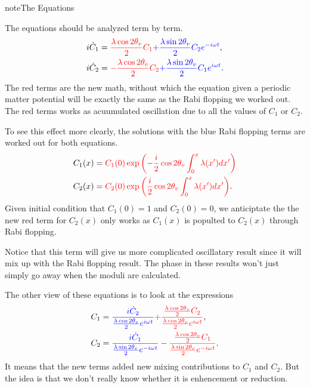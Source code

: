 \documentclass[letterpaper,12pt,english]{sphinxmanual}
\begin{document}
\begin{notice}{note}{The Equations}

The equations should be analyzed term by term.
\begin{gather}
\begin{split}i \dot C_1 & = {\color{red}\frac{\lambda \cos 2\theta_v}{2} C_1} {\color{blue}+ \frac{\lambda \sin 2\theta_v}{2} C_2 e^{-i\omega t}}, \\
i \dot C_2 & = {\color{red}-\frac{\lambda \cos 2\theta_v}{2} C_2} {\color{blue}+ \frac{\lambda \sin 2\theta_v}{2} C_1 e^{i\omega t}}.\end{split}\notag
\end{gather}
The red terms are the new math, without which the equation given a periodic matter potential will be exactly the same as the Rabi flopping we worked out. The red terms works as acuumulated oscillation due to all the values of \(C_1\) or \(C_2\).

To see this effect more clearly, the solutions with the blue Rabi flopping terms are worked out for both equations.
\begin{gather}
\begin{split}C_1(x) & = {\color{red}C_1(0) \exp\left( -\frac{i}{2} \cos 2\theta_v \int_0^x \lambda (x') dx' \right)} \\
C_2(x) & = {\color{red}C_2(0) \exp \left( \frac{i}{2} \cos 2\theta_v \int_0^x \lambda(x') dx' \right)}.\end{split}\notag
\end{gather}
Given initial condition that \(C_1(0)=1\) and \(C_2(0)=0\), we anticiptate the the new red term for \(C_2(x)\) only works as \(C_1(x)\) is populted to \(C_2(x)\) through Rabi flopping.

Notice that this term will give us more complicated oscillatary result since it will mix up with the Rabi flopping result. The phase in these results won't just simply go away when the moduli are calculated.

The other view of these equations is to look at the expressions
\begin{gather}
\begin{split}C_1 &= {\color{blue}\frac{ i \dot C_2}{\frac{\lambda \cos 2\theta_v}{2} e^{i\omega t}}} {\color{red} + \frac{\frac{\lambda \cos 2\theta_v }{2}C_2 }{\frac{\lambda \cos 2\theta_v}{2} e^{i\omega t}}  }, \\
C_2 & = {\color{blue}\frac{ i \dot C_1}{ \frac{\lambda \sin 2\theta_v}{2} e^{-i\omega t} }  } -  {\color{red} \frac{\frac{\lambda \cos 2\theta_v }{2}C_1  }{ \frac{\lambda \sin 2\theta_v}{2} e^{-i\omega t} }  }.\end{split}\notag
\end{gather}
It means that the new terms added new mixing contributions to \(C_1\) and \(C_2\). But the idea is that we don't really know whether it is enhencement or reduction.
\end{notice}
\end{document}
